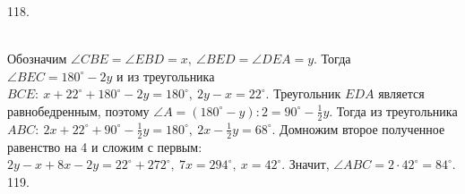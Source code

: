 \documentclass[12pt]{article}
\begin{document}
118.\begin{figure}[ht!]
\end{figure}\\
Обозначим $\angle CBE=\angle EBD=x,\ \angle BED=\angle DEA=y.$ Тогда $\angle BEC=180^\circ-2y$ и из треугольника $BCE:\ x+22^\circ+180^\circ-2y=180^\circ,\ 2y-x=22^\circ.$ Треугольник $EDA$ является равнобедренным, поэтому $\angle A=(180^\circ-y):2=90^\circ-\frac{1}{2}y.$ Тогда из треугольника $ABC:\ 2x+22^\circ+90^\circ-\frac{1}{2}y=180^\circ,\ 2x-\frac{1}{2}y=68^\circ.$ Домножим второе полученное равенство на 4 и сложим с первым: $2y-x+8x-2y=22^\circ+272^\circ,\ 7x=294^\circ,\ x=42^\circ.$ Значит, $\angle ABC=2\cdot42^\circ=84^\circ.$\\
119. \begin{figure}[ht!]
\end{figure}\\
\end{document}

